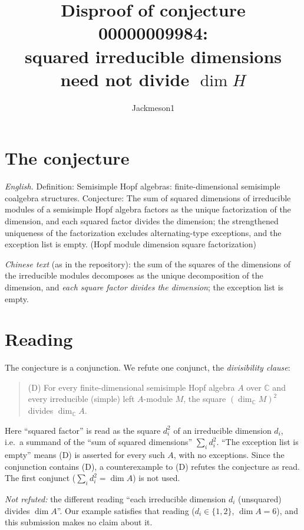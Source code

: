 \documentclass[11pt]{article}
\title{Disproof of conjecture 00000009984:\\ squared irreducible dimensions need not divide $\dim H$}
\author{Jackmeson1}
\date{}
\theoremstyle{definition}
\begin{document}
\maketitle

\section{The conjecture}
\emph{English.} Definition: Semisimple Hopf algebras: finite-dimensional semisimple coalgebra
structures. Conjecture: The sum of squared dimensions of irreducible modules of a semisimple Hopf
algebra factors as the unique factorization of the dimension, and each squared factor divides the
dimension; the strengthened uniqueness of the factorization excludes alternating-type exceptions,
and the exception list is empty. (Hopf module dimension square factorization)

\emph{Chinese text} (as in the repository): the sum of the squares of the dimensions of the
irreducible modules decomposes as the unique decomposition of the dimension, and \emph{each square
factor divides the dimension}; the exception list is empty.

\section{Reading}
The conjecture is a conjunction. We refute one conjunct, the \emph{divisibility clause}:
\begin{quote}
(D) For every finite-dimensional semisimple Hopf algebra $A$ over $\mathbb{C}$ and every
irreducible (simple) left $A$-module $M$, the square $(\dim_{\mathbb{C}} M)^2$ divides
$\dim_{\mathbb{C}} A$.
\end{quote}
Here ``squared factor'' is read as the square $d_i^2$ of an irreducible dimension $d_i$, i.e.\ a
summand of the ``sum of squared dimensions'' $\sum_i d_i^2$. ``The exception list is empty'' means
(D) is asserted for every such $A$, with no exceptions. Since the conjunction contains (D), a
counterexample to (D) refutes the conjecture as read. The first conjunct ($\sum_i d_i^2=\dim A$)
is not used.

\emph{Not refuted:} the different reading ``each irreducible dimension $d_i$ (unsquared) divides
$\dim A$''. Our example satisfies that reading ($d_i\in\{1,2\}$, $\dim A=6$), and this submission
makes no claim about it.
\end{document}
